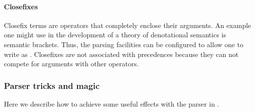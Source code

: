 \paragraph{Closefixes}

Closefix terms are operators that completely enclose their arguments.
An example one might use in the development of a theory of
denotational semantics is semantic brackets.  Thus, the \HOL{} parsing
facilities can be configured to allow one to write 
as \holtxt{[| x |]}.  Closefixes are not associated with precedences
because they can not compete for arguments with other operators.


\subsubsection{Parser tricks and magic}

Here we describe how to achieve some useful effects with the
parser in \HOL{}.

